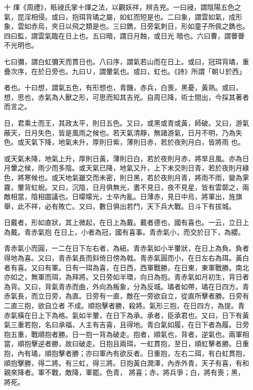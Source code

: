 
\begin{pinyinscope}

 十
 煇《周禮》，眡祲氏掌十煇之法，以觀妖祥，辨吉兇。一曰祲，謂陰陽五色之氣，昆淫相侵。或曰，抱珥背璚之屬，如虹而短是也。二曰象，謂雲如氣，成形象，雲如赤烏，夾日以飛之類是也。三曰鐫，日旁氣刺日，形如童子所佩之鐫也。四曰監，謂雲氣臨在日上也。五曰暗，謂日月蝕，或日光
 暗也。六曰曹，謂瞢瞢不光明也。



 七曰彌，謂白虹彌天而貫日也。八曰序，謂氣若山而在日上。或曰，冠珥背璚，重疊次序，在於日旁也。九曰Ｕ，謂暈氣也。或曰，虹也。《詩》所謂「朝Ｕ於西」



 者也。十曰想，謂氣五色，有形想也，青饑，赤兵，白喪，黑憂，黃熟。或曰，想，思也，赤氣為人獸之形，可思而知其吉兇。自周已降，術士間出，今採其著者而言之。



 日，君乘土而王，其政太平，則日五色。又曰，或黑或青或黃，師破。又曰，游氣蔽天，日月失色，皆是風雨之候也。若天氣清靜，無諸游氣，日月不明，乃為失色。或天氣下降，地氣未升，厚則日紫，薄則日赤，若於夜則月白，皆將雨
 也。



 或天氣未降，地氣上升，厚則日黃，薄則日白，若於夜則月赤，將旱且風。亦為日月暈之候，雨少而多陰。或天氣已降，地氣又升，上下未交則日青，若於夜則月綠色，將寒候也。或天地氣雖交而未密，則日黑，若於夜則月青，將雨不雨，變為雺霧，暈背虹蜺。又曰，沉陰，日月俱無光，晝不見日，夜不見星，皆有雲鄣之，兩敵相當，陰相圖議也。日曚曚光，士卒內亂。日薄赤，見日中烏，將軍出，旌旗舉，此不祥，必有敗亡。又曰，數日俱出若鬥，天下兵大戰。日斗下有拔城。



 日戴者，形如直狀，其上微起，在日上為戴。戴者德也，國有喜也。一云，立日上為戴。青赤氣抱
 在日上，小者為冠，國有喜事。青赤氣小，而交於日下，為纓。



 青赤氣小而圓，一二在日下左右者，為紐。青赤氣如小半暈狀，在日上為負。負者得地為喜。又曰，青赤氣長而斜倚日傍為戟。青赤氣圓而小，在日左右為珥。黃白者有喜。又曰有軍。日有一珥為喜，在日西，西軍戰勝，在日東，東軍戰勝。南北亦如之，無軍而珥，為拜將。又日旁如半環，向日為抱。青赤氣如月初生，背日者為背。又曰，背氣青赤而曲，外向為叛象，分為反城。璚者如帶，璚在日四方。青赤氣長，而立日旁，為直。日旁有一直，敵在一旁欲自立，從直所擊者勝。日旁有二直三抱，欲自立者
 不成。順抱擊者勝，殺將。氣形三抱，在日四方，為提。青赤氣橫在日上下為格。氣如半暈，在日下為承。承者，臣承君也。又曰，日下有黃氣三重若抱，名曰承福，人主有吉喜，且得地。青白氣如履，在日下者為履。日旁抱五重，戰順抱者勝。日一抱一背為破走。抱者，順氣也，背者，逆氣也。兩軍相當，順抱擊逆者勝，故曰破走。日抱且兩珥，一虹貫抱，至日，順虹擊者勝。日重抱，內有璚，順抱擊者勝；亦曰軍內有欲反者。日重抱，左右二珥，有白虹貫抱，順抱擊勝，得二將。有三虹，得三將。日抱黃白潤澤，內赤外青，天子有喜，有和親來降者。軍不戰，敵降，軍罷。色青，
 將喜；赤，將兵爭；白，將有喪；黑，將死。




\end{pinyinscope}
